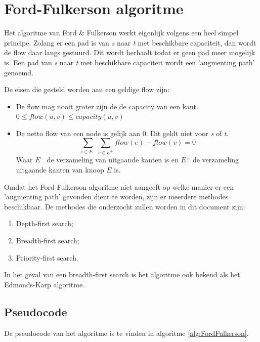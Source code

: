 \section{Ford-Fulkerson algoritme}
\label{sec:fordfulkerson}

Het algoritme van Ford \& Fulkerson werkt eigenlijk volgens een heel simpel principe. Zolang er een pad is van \textit{s} naar \textit{t} met beschikbare capaciteit, dan wordt de flow daar langs gestuurd. Dit wordt herhaalt todat er geen pad meer mogelijk is. Een pad van \textit{s} naar \textit{t} met beschikbare capaciteit wordt een 'augmenting path' genoemd.

De eisen die gesteld worden aan een geldige flow zijn:

\begin{itemize}
	\item De flow mag nooit groter zijn de de capacity van een kant. $0 \leq flow(u,v) \leq capacity(u,v)$
	\item De netto flow van een node is gelijk aan 0. Dit geldt niet voor \textit{s} of \textit{t}.$$\sum_{e \in E^-}\sum_{v \in E^+}{flow(e)-flow(v)} = 0$$
Waar $E^-$ de verzameling van uitgaande kanten is en $E^+$ de verzameling uitgaande kanten van knoop $E$ is.
\end{itemize}

Omdat het Ford-Fulkerson algoritme niet aangeeft op welke manier er een 'augmenting path' gevonden dient te worden, zijn er meerdere methodes beschikbaar.
De methodes die onderzocht zullen worden in dit document zijn:

\begin{enumerate}
	\item Depth-first search;
	\item Breadth-first search;
	\item Priority-first search.
\end{enumerate}

In het geval van een breadth-first search is het algoritme ook bekend als het Edmonds-Karp algoritme.

\subsection{Pseudocode}

De pseudocode van het algoritme is te vinden in algoritme \ref{alg:FordFulkerson}.

